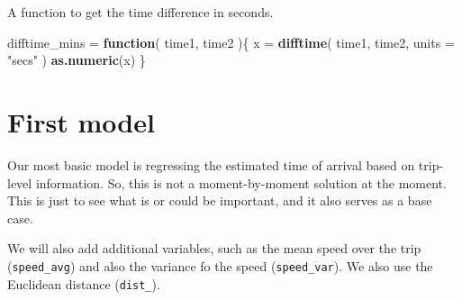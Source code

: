 \documentclass[]{article}
\newenvironment{Shaded}{\begin{snugshade}}{\end{snugshade}}
\newcommand{\ControlFlowTok}[1]{\textcolor[rgb]{0.13,0.29,0.53}{\textbf{#1}}}
\newcommand{\DataTypeTok}[1]{\textcolor[rgb]{0.13,0.29,0.53}{#1}}
\newcommand{\KeywordTok}[1]{\textcolor[rgb]{0.13,0.29,0.53}{\textbf{#1}}}
\newcommand{\NormalTok}[1]{#1}
\newcommand{\StringTok}[1]{\textcolor[rgb]{0.31,0.60,0.02}{#1}}
\begin{document}
A function to get the time difference in seconds.

\begin{Shaded}
\begin{Highlighting}[]
\NormalTok{difftime_mins =}\StringTok{ }\ControlFlowTok{function}\NormalTok{( time1, time2 )\{}
\NormalTok{    x =}\StringTok{ }\KeywordTok{difftime}\NormalTok{( time1, time2, }\DataTypeTok{units =} \StringTok{"secs"}\NormalTok{ )}
    \KeywordTok{as.numeric}\NormalTok{(x)}
\NormalTok{\}}
\end{Highlighting}
\end{Shaded}

\hypertarget{first-model}{%
\section{First model}\label{first-model}}

Our most basic model is regressing the estimated time of arrival based
on trip-level information. So, this is not a moment-by-moment solution
at the moment. This is just to see what is or could be important, and it
also serves as a base case.

We will also add additional variables, such as the mean speed over the
trip (\texttt{speed\_avg}) and also the variance fo the speed
(\texttt{speed\_var}). We also use the Euclidean distance
(\texttt{dist\_}).
\end{document}
